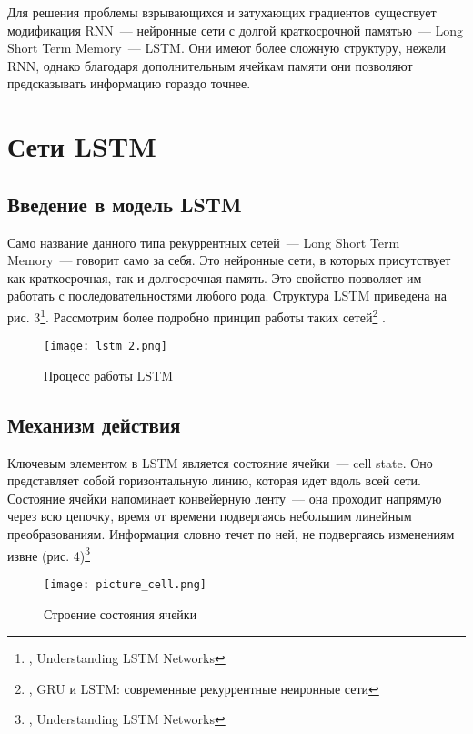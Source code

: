 \documentclass[12pt, a4paper]{article}
\begin{document}
Для решения проблемы взрывающихся и затухающих градиентов существует модификация RNN~--- нейронные сети с долгой краткосрочной памятью~--- Long Short Term Memory~--- LSTM. Они имеют более сложную структуру, нежели RNN, однако благодаря дополнительным ячейкам памяти они позволяют предсказывать информацию гораздо точнее. \\

\section{Сети LSTM}

\subsection{Введение в модель LSTM}

Само название данного типа рекуррентных сетей~--- Long Short Term Memory~--- говорит само за себя. Это нейронные сети, в которых присутствует как краткосрочная, так и долгосрочная память. Это свойство позволяет им работать с последовательностями любого рода. Структура LSTM приведена на рис. 3\footnote{\cite{Colah}, Understanding LSTM Networks}. Рассмотрим более подробно принцип работы таких сетей\footnote{\cite{Moluch}, GRU и LSTM: современные рекуррентные неиронные сети} .

\begin{figure}[h]
    \centering
    \texttt{[image: lstm\_2.png]}
		\caption{Процесс работы LSTM}
\end{figure}

\subsection{Механизм действия}

Ключевым элементом в LSTM является состояние ячейки~--- cell state.
Оно представляет собой горизонтальную линию, которая идет вдоль всей сети.
Состояние ячейки напоминает конвейерную ленту~--- она проходит напрямую через всю цепочку, время от времени подвергаясь небольшим линейным преобразованиям. Информация словно течет по ней, не подвергаясь изменениям извне (рис. 4)\footnote{\cite{Colah}, Understanding LSTM Networks} \\

\begin{figure}[h]
    \centering
    \texttt{[image: picture\_cell.png]}
		\caption{Строение состояния ячейки}
\end{figure}
\end{document}
